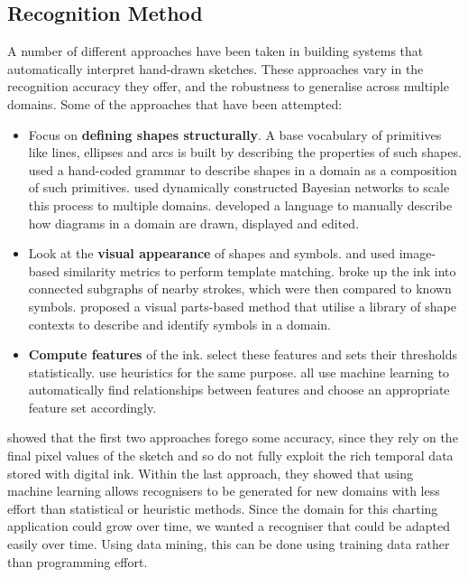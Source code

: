	\subsection{Recognition Method}
	A number of different approaches have been taken in building systems that automatically interpret hand-drawn sketches. These approaches vary in the recognition accuracy they offer, and the robustness to generalise across multiple domains. Some of the approaches that have been attempted:
	
	\begin{itemize}
		\item Focus on \textbf{defining shapes structurally}. A base vocabulary of primitives like lines, ellipses and arcs is built by describing the properties of such shapes. \cite{shilman_statistical_2002} used a hand-coded grammar to describe shapes in a domain as a composition of such primitives. \cite{alvarado_sketchread:_2004} used dynamically constructed Bayesian networks to scale this process to multiple domains. \cite{hammond_ladder:_2006} developed a language to manually describe how diagrams in a domain are drawn, displayed and edited. 
		\item Look at the \textbf{visual appearance} of shapes and symbols. \cite{kara_image-based_2004} and \cite{ouyang_visual_2009} used image-based similarity metrics to perform template matching. \cite{shilman_recognition_2004} broke up the ink into connected subgraphs of nearby strokes, which were then compared to known symbols. \cite{oltmans_envisioning_2007} proposed a visual parts-based method that utilise a library of shape contexts to describe and identify symbols in a domain.
		\item \textbf{Compute features} of the ink. \cite{patel_ink_2007} select these features and sets their thresholds statistically. \cite{yu_domain-independent_2003} use heuristics for the same purpose. \cite{chang_rata._2010,  rubine_specifying_1991, willems_iconic_2009} all use machine learning to automatically find relationships between features and choose an appropriate feature set accordingly.
	\end{itemize}		
	
	\cite{chang_rata._2010} showed that the first two approaches forego some accuracy, since they rely on the final pixel values of the sketch and so do not fully exploit the rich temporal data stored with digital ink. Within the last approach, they showed that using machine learning allows recognisers to be generated for new domains with less effort than statistical or heuristic methods. Since the domain for this charting application could grow over time, we wanted a recogniser that could be adapted easily over time. Using data mining, this can be done using training data rather than programming effort.
	
